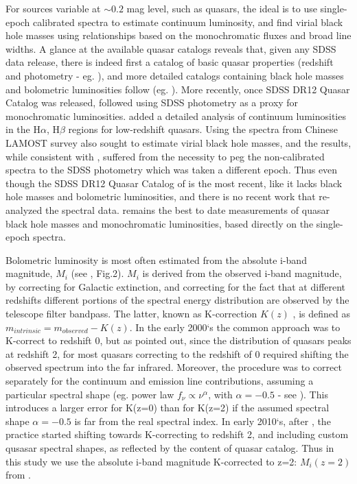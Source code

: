 \documentclass[twocolumn]{aastex62}
\begin{document}
For sources variable at ${\sim}0.2$ mag level, such as quasars, the ideal is to use single-epoch calibrated spectra to estimate continuum luminosity, and find virial black hole masses using relationships based on the monochromatic fluxes and broad line widths. A glance at the available quasar catalogs reveals that, given any SDSS data release, there is indeed first a catalog of basic quasar properties (redshift and photometry - eg. \citealt{schneider2007, schneider2010}), and more detailed catalogs containing black hole masses and bolometric luminosities  follow (eg. \citealt{shen2008, shen2011}). More recently, once SDSS DR12 Quasar Catalog \citep{paris2017} was released,  \citealt{kozlowski2017a} followed using SDSS photometry as a proxy for monochromatic luminosities. \citet{chen2018} added a detailed analysis of continuum luminosities in the  H$\alpha$, H$\beta$ regions for low-redshift quasars. Using the spectra from Chinese LAMOST survey \citet{dong2018} also sought to estimate virial black hole masses, and the results, while consistent with \citet{shen2011}, suffered from the necessity to peg the non-calibrated spectra to the SDSS photometry which was taken  a different epoch. Thus even though the SDSS DR12 Quasar Catalog of \cite{paris2018}  is the most recent, like \citet{paris2017} it lacks black hole masses and bolometric luminosities, and there is no recent work that re-analyzed the spectral data. \citet{shen2011} remains the best to date measurements of quasar black hole masses and monochromatic luminosities, based directly on the single-epoch spectra. 


Bolometric luminosity is most often estimated from the absolute i-band magnitude, $M_{i}$ (see \citealt{shen2008}, Fig.2). $M_{i}$ is derived from the observed i-band magnitude, by correcting for Galactic extinction, and correcting for the fact that at different redshifts different portions of the spectral energy distribution are observed by the telescope filter bandpass. The latter, known as K-correction $K(z)$ \citep{oke1968},  is defined as $m_{intrinsic} = m_{observed} - K(z)$. In the early 2000`s the common approach was to K-correct to redshift 0, but as \citep{richards2006a} pointed out, since the distribution of quasars peaks at redshift 2, for most quasars correcting to the redshift of 0 required shifting the observed spectrum into the far infrared. Moreover, the procedure was to correct separately for the continuum and emission line contributions, assuming a particular spectral shape (eg. power law  $f_{\nu} \propto \nu^{\alpha}$, with $\alpha=-0.5$ - see \citealt{schneider2010, vandenberk2001, richards2006a}).  This introduces a larger error for K(z=0) than for K(z=2) if the assumed spectral shape $\alpha=-0.5$ is far from the real spectral index. In early 2010`s, after  \citealt{richards2006a, wisotzki2000, blanton2003},  the practice started shifting towards K-correcting to redshift 2,  and including custom qusasar spectral shapes, as reflected by the content of \cite{shen2011} quasar catalog. Thus in this study we use  the absolute i-band magnitude K-corrected to z=2: $M_{i}(z=2)$ from \citep{shen2011}. 
\end{document}
